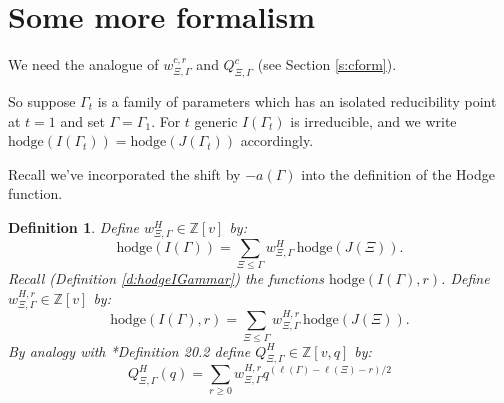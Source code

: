 \documentclass[12pt,leqno]{article}
\newtheorem{definition}[equation]{Definition}
\newtheorem{lemma}[equation]{Lemma}
\newcommand{\hodge}{\text{hodge}}
\newcommand{\mult}{\text{mult}}
\newcommand{\Z}{\mathbb Z}
\renewcommand{\sec}[1]{\section{#1}
\renewcommand{\theequation}{\thesection.\arabic{equation}}
  \setcounter{equation}{0}}
\renewcommand{\sec}[1]{\section{#1}
\renewcommand{\theequation}{\thesection.\arabic{equation}}
  \setcounter{equation}{0}}
\begin{document}

\sec{Some more formalism}

We need the analogue of $w^{c,r}_{\Xi,\Gamma}$ and $Q^c_{\Xi,\Gamma}$ (see Section \ref{s:cform}).

So suppose $\Gamma_t$ is a family of parameters which has an isolated reducibility point at
$t=1$ and set $\Gamma=\Gamma_1$.
For $t$ generic $I(\Gamma_t)$ is irreducible, and we write
$\hodge(I(\Gamma_t))=\hodge(J(\Gamma_t))$ accordingly.


Recall we've incorporated the shift by $-a(\Gamma)$ into the
definition of the Hodge function.

\begin{definition}
\label{d:w^H}
Define $w^H_{\Xi,\Gamma}\in\Z[v]$ by:
{\normalfont
\begin{equation}
\label{e:z}
\hodge(I(\Gamma))=\sum_{\Xi\le\Gamma}w^H_{\Xi,\Gamma}\,\hodge(J(\Xi)).
\end{equation}
}
Recall (Definition \ref{d:hodgeIGammar}) the functions {\normalfont $\hodge(I(\Gamma),r)$}.
Define $w_{\Xi,\Gamma}^{H,r}\in\Z[v]$ by:
{\normalfont
$$
\hodge(I(\Gamma),r)=\sum_{\Xi\le\Gamma} w_{\Xi,\Gamma}^{H,r}\,\hodge(J(\Xi)).
$$
}
By analogy with   \cite{unitaryDual}*{Definition 20.2} define
$Q^H_{\Xi,\Gamma}\in\Z[v,q]$ by:
\begin{equation}
\label{e:Qh}
Q^H_{\Xi,\Gamma}(q)=\sum_{r\ge 0} w^{H,r}_{\Xi,\Gamma}q^{(\ell(\Gamma)-\ell(\Xi)-r)/2}
\end{equation}
\end{definition}
\end{document}

